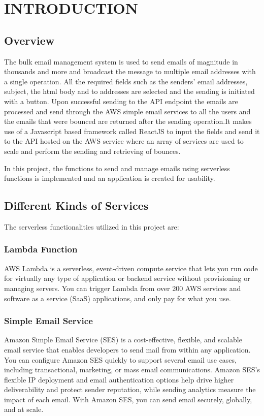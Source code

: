\chapter{INTRODUCTION}
\label{intro}

\justifying

\section{Overview}
The bulk email management system is used to send emails of magnitude in thousands and more and broadcast the message to multiple email addresses with a single operation. All the required fields such as the senders’ email addresses, subject, the html body and to addresses are selected and the sending is initiated with a button. Upon successful sending to the API endpoint the emails are processed and send through the AWS simple email services to all the users and the emails that were bounced are returned after the sending operation.It makes use of a Javascript based framework called ReactJS to input the fields and send it to the API hosted on the AWS service where an array of services are used to scale and perform the sending and retrieving of bounces.\par
\noindent
In this project, the functions to send and manage emails using serverless functions is implemented and an application is created for usability. \section{Different Kinds of Services}

The serverless functionalities utilized in this project are:

\subsection{Lambda Function}
AWS Lambda is a serverless, event-driven compute service that lets you run code for virtually any type of application or backend service without provisioning or managing servers. You can trigger Lambda from over 200 AWS services and software as a service (SaaS) applications, and only pay for what you use.\cite{awslambda}

\subsection{Simple Email Service
}

Amazon Simple Email Service (SES) is a cost-effective, flexible, and scalable email service that enables developers to send mail from within any application. You can configure Amazon SES quickly to support several email use cases, including transactional, marketing, or mass email communications. Amazon SES's flexible IP deployment and email authentication options help drive higher deliverability and protect sender reputation, while sending analytics measure the impact of each email. With Amazon SES, you can send email securely, globally, and at scale.\cite{awsses}

